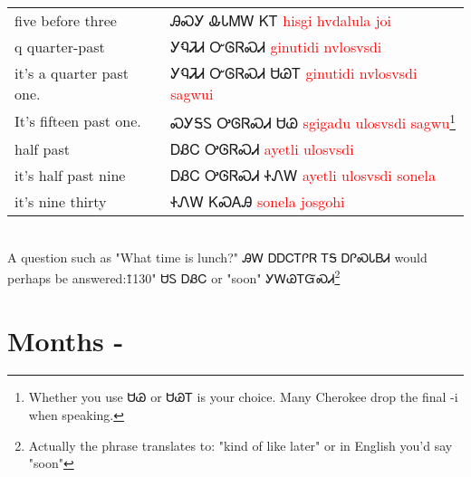 \cite{feelingHiderGregg202Dpp9}\\
\begin{minipage}{\linewidth}
\begin{tabular}{p{5cm} p{9cm}}
five before three & ᎯᏍᎩ ᎲᏓᎷᎳ ᏦᎢ 
 \newline \textcolor{red}{hisgi hvdalula joi}\\
q quarter-past & ᎩᏄᏘᏗ ᏅᎶᏒᏍᏗ 
 \newline \textcolor{red}{ginutidi nvlosvsdi}\\
it's a quarter past one. & ᎩᏄᏘᏗ ᏅᎶᏒᏍᏗ ᏌᏊᎢ 
 \newline \textcolor{red}{ginutidi nvlosvsdi sagwui}\\
It's fifteen past one. & ᏍᎩᎦᏚ ᎤᎶᏒᏍᏗ ᏌᏊ 
 \newline \textcolor{red}{sgigadu ulosvsdi sagwu}\footnote{Whether you use ᏌᏊ or ᏌᏊᎢ is your choice.  Many Cherokee drop the final -i when speaking.}\\
half past & ᎠᏰᏟ ᎤᎶᏒᏍᏗ 
 \newline \textcolor{red}{ayetli ulosvsdi}\\
it's half past nine & ᎠᏰᏟ ᎤᎶᏒᏍᏗ ᏐᏁᎳ 
 \newline \textcolor{red}{ayetli ulosvsdi sonela}\\
it's nine thirty & ᏐᏁᎳ ᏦᏍᎪᎯ 
 \newline \textcolor{red}{sonela josgohi}\\
\end{tabular}
\end{minipage}

\cite{feelingHiderGregg202Dpp9}\\
A question such as "What time is lunch?" ᎯᎳ ᎠᎠᏟᎢᎵᏒ ᎢᎦ ᎠᎵᏍᏓᏴᏗ would perhaps be answered:\"1130" ᏌᏚ ᎠᏰᏟ or "soon" ᎩᎳᏊᎢᏳᏍᏗ\footnote{Actually the phrase translates to: "kind of like later" or in English you'd say "soon"}\cite{feelingHiderGregg202Dpp9}
\index{}
\chapter*{Months - }

